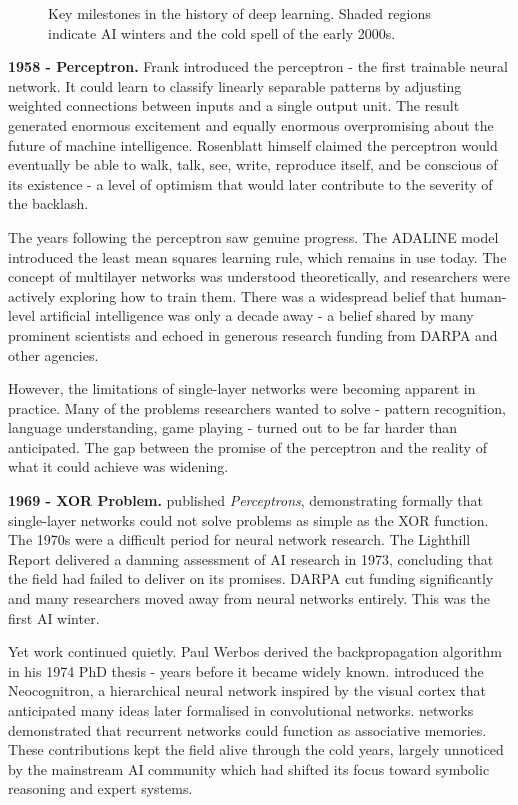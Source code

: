 \begin{figure}[h]
    \centering
    
    \caption{Key milestones in the history of deep learning. Shaded regions indicate AI winters and the cold spell of the early 2000s.}
    \label{fig:history}
\end{figure}

\textbf{1958 - Perceptron.} Frank \cite{rosenblatt1958perceptron} introduced the perceptron - the first trainable neural network. It could learn to classify linearly separable patterns by adjusting weighted connections between inputs and a single output unit. The result generated enormous excitement and equally enormous overpromising about the future of machine intelligence. Rosenblatt himself claimed the perceptron would eventually be able to walk, talk, see, write, reproduce itself, and be conscious of its existence - a level of optimism that would later contribute to the severity of the backlash.

The years following the perceptron saw genuine progress. The ADALINE model \cite{widrow1960adaline} introduced the least mean squares learning rule, which remains in use today. The concept of multilayer networks was understood theoretically, and researchers were actively exploring how to train them. There was a widespread belief that human-level artificial intelligence was only a decade away - a belief shared by many prominent scientists and echoed in generous research funding from DARPA and other agencies.

However, the limitations of single-layer networks were becoming apparent in practice. Many of the problems researchers wanted to solve - pattern recognition, language understanding, game playing - turned out to be far harder than anticipated. The gap between the promise of the perceptron and the reality of what it could achieve was widening.

\textbf{1969 - XOR Problem.} \cite{minsky1969perceptrons} published \textit{Perceptrons}, demonstrating formally that single-layer networks could not solve problems as simple as the XOR function. The 1970s were a difficult period for neural network research. The Lighthill Report \cite{lighthill1973} delivered a damning assessment of AI research in 1973, concluding that the field had failed to deliver on its promises. DARPA cut funding significantly and many researchers moved away from neural networks entirely. This was the first AI winter.

Yet work continued quietly. Paul Werbos derived the backpropagation algorithm in his 1974 PhD thesis \cite{werbos1974thesis} - years before it became widely known. \cite{fukushima1980neocognitron} introduced the Neocognitron, a hierarchical neural network inspired by the visual cortex that anticipated many ideas later formalised in convolutional networks. \cite{hopfield1982neural} networks demonstrated that recurrent networks could function as associative memories. These contributions kept the field alive through the cold years, largely unnoticed by the mainstream AI community which had shifted its focus toward symbolic reasoning and expert systems.

